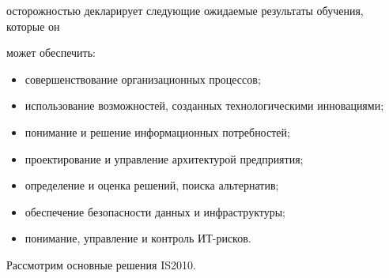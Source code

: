 осторожностью декларирует следующие ожидаемые результаты обучения, которые он 

может обеспечить: 

\begin{itemize}

\item  совершенствование организационных процессов;

\item использование возможностей, созданных технологическими инновациями;

\item понимание и решение информационных потребностей;

\item проектирование и управление архитектурой предприятия;

\item определение и оценка решений, поиска альтернатив;

\item обеспечение безопасности данных и инфраструктуры;

\item понимание, управление и контроль ИТ-рисков.

\end{itemize}



Рассмотрим основные решения IS2010.

